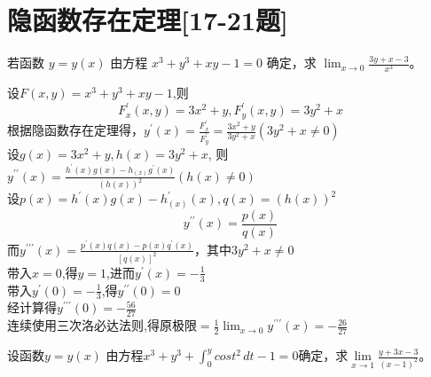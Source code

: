 \section*{隐函数存在定理[17-21题]}
\begin{question}
    若函数 \( y = y(x) \) 由方程 \( x^{3} + y^{3} + xy - 1 = 0 \) 确定，求 \( \lim_{x \to 0} \frac{3y + x - 3}{x^{3}} \)。
\end{question}
\begin{solution}
    设\(F(x,y) = x^3 +y^3 + xy -1\),则
    \[F_{x}^{\prime}(x,y) = 3x^2+y,F_{y}^{\prime} (x,y) = 3y^2+x\]
    根据隐函数存在定理得，\(y^{\prime}(x) =\frac{F_{x}^{\prime}}{F_{y}^{\prime}} 
    = \frac{3x^2+y}{3y^2+x} (3y^2+x \neq 0)\)\\设\(g(x) = 3x^2+y,h(x)=3y^2+x\),
    则\(y^{\prime\prime}(x) = \frac{h^{\prime}(x)g(x)-h_(x)g^{\prime}(x)}{(h(x))^2} (h(x)\neq0)\)\\
    设\(p(x) =h^{\prime}(x)g(x)-h_(x)^{\prime}(x),q(x) = (h(x))^2 \)
    \[y^{\prime\prime}(x) = \frac{p(x)}{q(x)}\]
    而\( y^{\prime\prime\prime}(x) = \frac{p^\prime(x)q(x)-p(x)q^\prime(x)}{[q(x)]^2}\)，其中\(3y^2+x\neq 0\)\\
    带入\(x=0\),得\(y=1\),进而\(y^\prime(x) = -\frac{1}{3}\)\\
    带入\(y^\prime(0) = -\frac{1}{3}\),得\(y^{\prime\prime} (0)= 0\)\\
    经计算得\(y^{\prime\prime\prime}(0)=-\frac{56}{27}\)\\
    连续使用三次洛必达法则,得原极限\(=\frac{1}{2}\lim_{x\to0}y^{\prime\prime\prime}(x)=-\frac{26}{27}\)
\end{solution}
\begin{question}
    设函数\(y = y(x)\) 由方程\(x^3+y^3 + \int_{0}^{y}cost^2 \,dt -1= 0\)确定，求\(\lim\limits_{x\to 1} \frac{y+3x-3}{(x-1)^2}\)。
\end{question}
